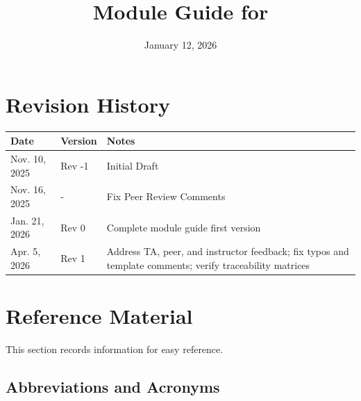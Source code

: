 \documentclass[12pt, titlepage]{article}
\begin{document}
\title{Module Guide for \progname{}}
\author{\authname}
\date{January 12, 2026}

\maketitle


\section{Revision History}

\begin{tabularx}{\textwidth}{p{3cm}p{2cm}X}
  \toprule {\bf Date} & {\bf Version} & {\bf Notes}                                              \\
  \midrule
  Nov. 10, 2025       & Rev -1        & Initial Draft                                            \\
  Nov. 16, 2025       & -             & Fix Peer Review Comments                                 \\
  Jan. 21, 2026       & Rev 0         & Complete module guide first version                      \\
  Apr. 5, 2026        & Rev 1         & Address TA, peer, and instructor feedback; fix typos and
  template comments; verify traceability matrices                                                \\
  \bottomrule
\end{tabularx}

\newpage

\section{Reference Material}

This section records information for easy reference.

\subsection{Abbreviations and Acronyms}
\end{document}
